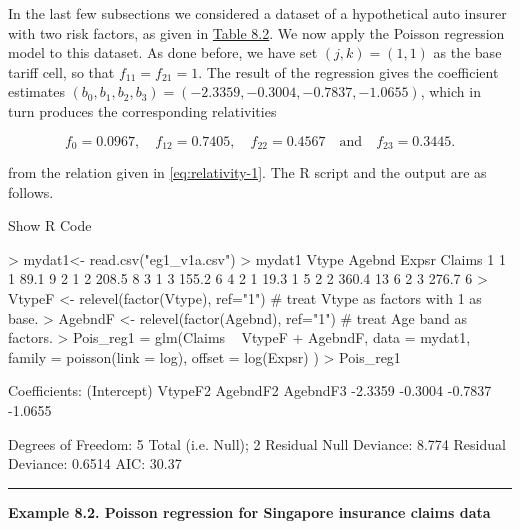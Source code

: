 \documentclass[]{book}
\newenvironment{Shaded}{\begin{snugshade}}{\end{snugshade}}
\newcommand{\NormalTok}[1]{#1}
\theoremstyle{definition}
\theoremstyle{definition}
\theoremstyle{definition}
\theoremstyle{remark}
\begin{document}
In the last few subsections we considered a dataset of a hypothetical
auto insurer with two risk factors, as given in
\protect\hyperlink{tab:8.2}{Table 8.2}. We now apply the Poisson
regression model to this dataset. As done before, we have set
\((j,k)=(1,1)\) as the base tariff cell, so that \(f_{11}=f_{21}=1\).
The result of the regression gives the coefficient estimates
\((b_0, b_1,b_2,b_3)=(-2.3359, -0.3004, -0.7837, -1.0655 )\), which in
turn produces the corresponding relativities

\begin{equation}
\nonumber
{f}_0=0.0967, \quad {f}_{12}=  0.7405, \quad {f}_{22}=0.4567 \quad \text{and}\quad {f}_{23}=0.3445.
\end{equation}

from the relation given in \eqref{eq:relativity-1}. The R script and the
output are as follows.

Show R Code

\hypertarget{toggleCodeRiskClass.1}{}
\begin{Shaded}
\begin{Highlighting}[]
\NormalTok{> mydat1<- read.csv("eg1_v1a.csv")}
\NormalTok{> mydat1}
\NormalTok{  Vtype Agebnd Expsr Claims}
\NormalTok{1     1      1  89.1      9}
\NormalTok{2     1      2 208.5      8}
\NormalTok{3     1      3 155.2      6}
\NormalTok{4     2      1  19.3      1}
\NormalTok{5     2      2 360.4     13}
\NormalTok{6     2      3 276.7      6}
\NormalTok{> VtypeF <- relevel(factor(Vtype), ref="1") # treat Vtype as factors with 1 as base.}
\NormalTok{> AgebndF <- relevel(factor(Agebnd), ref="1") # treat Age band as factors.}
\NormalTok{> Pois_reg1 = glm(Claims ~ VtypeF + AgebndF,}
\NormalTok{                    data = mydat1, family = poisson(link = log), offset = log(Expsr) )}
\NormalTok{> Pois_reg1}

\NormalTok{Coefficients:}
\NormalTok{(Intercept)      VtypeF2     AgebndF2     AgebndF3  }
\NormalTok{    -2.3359      -0.3004      -0.7837      -1.0655  }

\NormalTok{Degrees of Freedom: 5 Total (i.e. Null);  2 Residual}
\NormalTok{Null Deviance:      8.774 }
\NormalTok{Residual Deviance: 0.6514   AIC: 30.37}
\end{Highlighting}
\end{Shaded}

\begin{center}\rule{0.5\linewidth}{\linethickness}\end{center}

\textbf{Example 8.2. Poisson regression for Singapore insurance claims
data}
\end{document}

